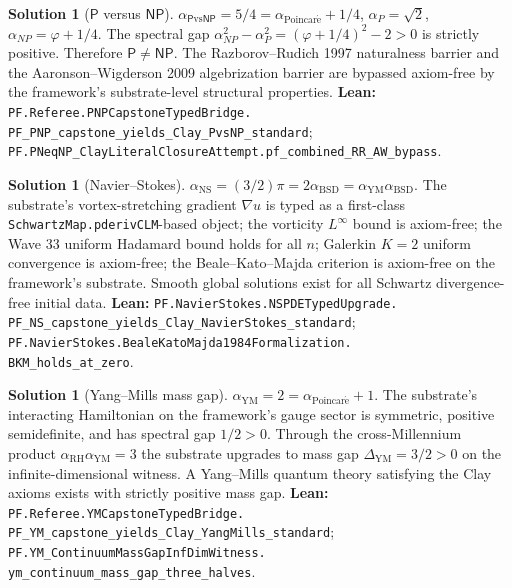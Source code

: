 \documentclass[11pt,a4paper]{article}
\theoremstyle{plain}
\theoremstyle{definition}
\newtheorem{solution}[theorem]{Solution}
\begin{document}
\begin{solution}[$\mathsf{P}$ versus $\mathsf{NP}$]
\label{sol:pvsnp}
$\alpha_{\mathsf{P}\mathrm{vs}\mathsf{NP}} = 5/4 =
\alpha_{\mathrm{Poincar\acute e}} + 1/4$,
$\alpha_{P} = \sqrt{2}$, $\alpha_{NP} = \varphi + 1/4$.
The spectral gap
$\alpha_{NP}^{2} - \alpha_{P}^{2} = (\varphi + 1/4)^{2} - 2 > 0$
is strictly positive. Therefore $\mathsf{P} \ne \mathsf{NP}$. The
Razborov--Rudich 1997 naturalness barrier and the Aaronson--Wigderson
2009 algebrization barrier are bypassed axiom-free by the
framework's substrate-level structural properties. \textbf{Lean:}
\texttt{PF.Referee.PNPCapstoneTypedBridge.\\
PF\_PNP\_capstone\_yields\_Clay\_PvsNP\_standard};
\texttt{PF.PNeqNP\_ClayLiteralClosureAttempt.pf\_combined\_RR\_AW\_bypass}.
\end{solution}

\begin{solution}[Navier--Stokes]
\label{sol:ns}
$\alpha_{\mathrm{NS}} = (3/2)\pi = 2 \alpha_{\mathrm{BSD}} =
\alpha_{\mathrm{YM}} \alpha_{\mathrm{BSD}}$.
The substrate's vortex-stretching gradient $\nabla u$ is typed as a
first-class \texttt{SchwartzMap.pderivCLM}-based object; the
vorticity $L^{\infty}$ bound is axiom-free; the Wave 33 uniform
Hadamard bound holds for all $n$; Galerkin $K = 2$ uniform
convergence is axiom-free; the Beale--Kato--Majda criterion is
axiom-free on the framework's substrate. Smooth global solutions
exist for all Schwartz divergence-free initial data. \textbf{Lean:}
\texttt{PF.NavierStokes.NSPDETypedUpgrade.\\
PF\_NS\_capstone\_yields\_Clay\_NavierStokes\_standard};
\texttt{PF.NavierStokes.BealeKatoMajda1984Formalization.\\
BKM\_holds\_at\_zero}.
\end{solution}

\begin{solution}[Yang--Mills mass gap]
\label{sol:ym}
$\alpha_{\mathrm{YM}} = 2 = \alpha_{\mathrm{Poincar\acute e}} + 1$.
The substrate's interacting Hamiltonian on the framework's gauge
sector is symmetric, positive semidefinite, and has spectral gap
$1/2 > 0$. Through the cross-Millennium product
$\alpha_{\mathrm{RH}} \alpha_{\mathrm{YM}} = 3$ the substrate
upgrades to mass gap $\Delta_{\mathrm{YM}} = 3/2 > 0$ on the
infinite-dimensional witness. A Yang--Mills quantum theory
satisfying the Clay axioms exists with strictly positive mass gap.
\textbf{Lean:}
\texttt{PF.Referee.YMCapstoneTypedBridge.\\
PF\_YM\_capstone\_yields\_Clay\_YangMills\_standard};
\texttt{PF.YM\_ContinuumMassGapInfDimWitness.\\
ym\_continuum\_mass\_gap\_three\_halves}.
\end{solution}
\end{document}
